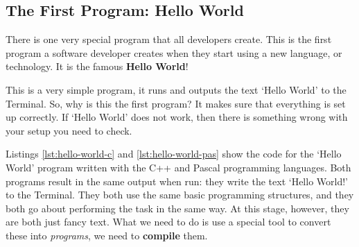 \clearpage
\subsection{The First Program: Hello World} %
\label{sub:hello world}

There is one very special program that all developers create. This is the first program a software developer creates when they start using a new language, or technology. It is the famous \textbf{Hello World}!

This is a very simple program, it runs and outputs the text `Hello World' to the Terminal. So, why is this the first program? It makes sure that everything is set up correctly. If `Hello World' does not work, then there is something wrong with your setup you need to check.

Listings \ref{lst:hello-world-c} and \ref{lst:hello-world-pas} show the code for the `Hello World' program written with the C++ and Pascal programming languages. Both programs result in the same output when run: they write the text `Hello World!' to the Terminal. They both use the same basic programming structures, and they both go about performing the task in the same way. At this stage, however, they are both just fancy text. What we need to do is use a special tool to convert these into \emph{programs}, we need to \textbf{compile} them.

\csection
{
}



